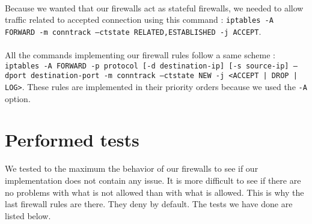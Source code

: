 \documentclass[a4paper, 11pt, oneside]{article}
\begin{document}
\paragraph{}Because we wanted that our firewalls act as stateful firewalls, we needed to allow traffic related to accepted connection using this command : \texttt{iptables -A FORWARD -m conntrack --ctstate RELATED,ESTABLISHED -j ACCEPT}.

\paragraph{}All the commands implementing our firewall rules follow a same scheme : \texttt{iptables -A FORWARD -p protocol [-d destination-ip] [-s source-ip] --dport destination-port -m conntrack --ctstate NEW -j <ACCEPT | DROP | LOG>}. These rules are implemented in their priority orders because we used the \texttt{-A} option. 

\section{Performed tests}

We tested to the maximum the behavior of our firewalls to see if our implementation does not contain any issue. It is more difficult to see if there are no problems with what is not allowed than with what is allowed. This is why the last firewall rules are there. They deny by default. The tests we have done are listed below.
\end{document}
